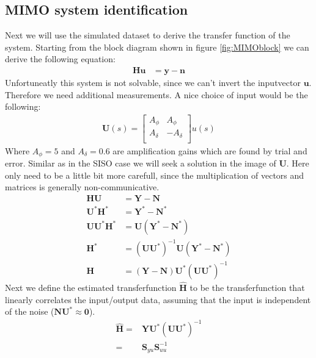\subsection{MIMO system identification}
Next we will use the simulated dataset to derive the transfer function of the system. Starting from the block diagram shown in figure \ref{fig:MIMOblock} we can derive the following equation:
\begin{align}
		\mathbf{H}\mathbf{u} & = \mathbf{y}-\mathbf{n} 
\end{align}
Unfortuneatly this system is not solvable, since we can't invert the inputvector $\mathbf{u}$. Therefore we need additional measurements. A nice choice of input would be the following:
\begin{align}
		\mathbf{U}(s) = \left[\begin{array}{cc}
									A_\phi &  A_\phi \\
									A_\delta & -A_\delta \\
			\end{array}\right] u(s)
\end{align}
Where $A_\phi=5$ and $A_\delta=0.6$ are amplification gains which are found by trial and error. Similar as in the SISO case we will seek a solution in the image of $\mathbf{U}$. Here only need to be a little bit more carefull, since the multiplication of vectors and matrices is generally non-communicative.
\begin{align}
		\mathbf{H}\mathbf{U} & = \mathbf{Y}-\mathbf{N}  \nonumber \\
		\mathbf{U}^\ast\mathbf{H}^\ast & = \mathbf{Y}^\ast-\mathbf{N} ^\ast \nonumber \\
			\mathbf{U}\mathbf{U}^\ast\mathbf{H}^\ast & = 	\mathbf{U}\left(\mathbf{Y}^*-\mathbf{N} ^\ast\right) \nonumber \\
			\mathbf{H}^\ast & = 	\left(\mathbf{U}\mathbf{U}^\ast\right)^{-1}\mathbf{U}\left(\mathbf{Y}^\ast-\mathbf{N} ^\ast\right) \nonumber \\
						\mathbf{H} & = 	\left(\mathbf{Y}-\mathbf{N}\right)\mathbf{U}^\ast\left(\mathbf{U}\mathbf{U}^\ast\right)^{-1} 
\end{align}
Next we define the estimated transferfunction $\hat{\mathbf{H}}$ to be the transferfunction that linearly correlates the input/output data, assuming that the input is independent of the noise ($\mathbf{N}\mathbf{U}^\ast \approx \mathbf{0}$). 
\begin{align}
						\hat{\mathbf{H}} 	= & \mathbf{Y}\mathbf{U}^\ast\left(\mathbf{U}\mathbf{U}^\ast\right)^{-1} \nonumber \\
																			= & \mathbf{S}_{yu}\mathbf{S}_{uu}^{-1}
		\label{eq:MIMOH}
\end{align}
